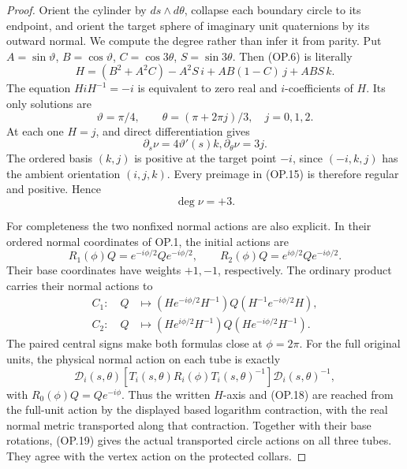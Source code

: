 \begin{proof}
Orient the cylinder by \(ds\wedge d\theta\), collapse each boundary
circle to its endpoint, and orient the target sphere of imaginary
unit quaternions by its outward normal. We compute the degree rather
than infer it from parity. Put \(A=\sin\vartheta\),
\(B=\cos\vartheta\), \(C=\cos3\theta\), \(S=\sin3\theta\).
Then (OP.6) is literally
\[
 H=(B^2+A^2C)-A^2S\,i+AB(1-C)\,j+AB S\,k.            \tag{OP.14}
\]
The equation \(HiH^{-1}=-i\) is equivalent to zero real and
\(i\)-coefficients of \(H\). Its only solutions are
\[
 \vartheta=\pi/4,\qquad
 \theta=(\pi+2\pi j)/3,
                   \quad j=0,1,2.                    \tag{OP.15}
\]
At each one \(H=j\), and direct differentiation gives
\[
                    \partial_s\nu=4\vartheta'(s)k,
                    \partial_\theta\nu=3j.           \tag{OP.16}
\]
The ordered basis \((k,j)\) is positive at the target point \(-i\),
since \((-i,k,j)\) has the ambient orientation \((i,j,k)\).
Every preimage in (OP.15) is therefore regular and positive. Hence
\[
                              \deg\nu=+3.             \tag{OP.17}
\]

For completeness the two nonfixed normal actions are also explicit.
In their ordered normal coordinates of OP.1, the initial actions are
\[
 R_1(\phi)Q=e^{-i\phi/2}Qe^{-i\phi/2},\qquad
 R_2(\phi)Q=e^{i\phi/2}Qe^{-i\phi/2}.
\]
Their base coordinates have weights \(+1,-1\), respectively.
The ordinary product carries their normal actions to
\[
 \begin{aligned}
 C_1:\quad Q&\longmapsto
 (He^{-i\phi/2}H^{-1})Q(H^{-1}e^{-i\phi/2}H),\\
 C_2:\quad Q&\longmapsto
 (He^{i\phi/2}H^{-1})Q(He^{-i\phi/2}H^{-1}).
 \end{aligned}                                               \tag{OP.18}
\]
The paired central signs make both formulas close at \(\phi=2\pi\).
For the full original units, the physical normal action on each tube is
exactly
\[
 \mathcal D_i(s,\theta)
      [T_i(s,\theta)R_i(\phi)T_i(s,\theta)^{-1}]
                          \mathcal D_i(s,\theta)^{-1},
                                                               \tag{OP.19}
\]
with \(R_0(\phi)Q=Qe^{-i\phi}\). Thus the written \(H\)-axis and
(OP.18) are reached from the full-unit action by the displayed based
logarithm contraction, with the real normal metric transported along
that contraction. Together with their base rotations, (OP.19) gives
the actual transported circle actions on all three tubes.
They agree with the vertex action on the protected collars.


\end{proof}
